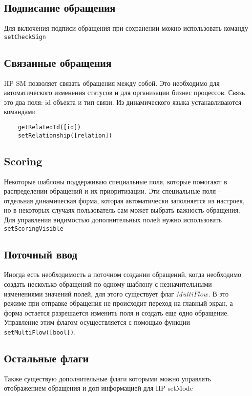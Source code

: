 \documentclass[../index.tex]{subfiles}
\begin{document}
\subsection{Подписание обращения}
Для включения подписи обращения при сохранении можно использовать команду \verb|setCheckSign|


\subsection{Связанные обращения}
HP SM позволяет связать обращения между собой. Это необходимо для автоматического изменения статусов и для
организации бизнес процессов. Связь это два поля: id объекта и тип связи. Из динамического языка устанавливаются командами
\begin{verbatim}
    getRelatedId([id])
    setRelationship([relation])
\end{verbatim} 

\subsection{Scoring}
Некоторые шаблоны поддерживаю специальные поля, которые помогают в распределении обращений и их приоритизации.
Эти специальные поля -- отдельная динамическая форма, которая автоматически заполняется из настроек, но в некоторых
случаях пользователь сам может выбрать важность обращения. Для управления видимостью дополнительных полей нужно использовать
\verb|setScoringVisible|

\subsection{Поточный ввод}
Иногда есть необходимость а поточном создании обращений, когда необходимо создать несколько обращений по одному 
шаблону с незначительными изменениями значений полей, для этого существует флаг $MultiFlow$. В это режиме
при отправке обращения не происходит переход на главный экран, а форма остается разрешается изменить поля и 
создать еще одно обращение. Управление этим флагом осуществляется с помощью функции \verb|setMultiFlow([bool])|.

\subsection{Остальные флаги}
Также существую дополнительные флаги которыми можно управлять отображением обращения и доп информацией для HP setMode
\end{document}
